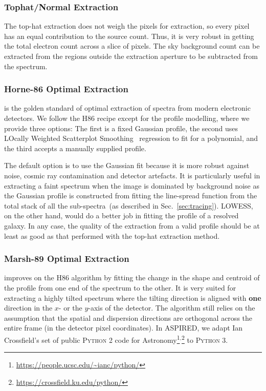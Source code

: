 \documentclass[linenumbers, twocolumn]{aastex631}
\begin{document}
\subsubsection*{Tophat/Normal Extraction}
\label{sec:tophat}
The top-hat extraction does not weigh the pixels for extraction,
so every pixel has an equal contribution to the source count. Thus,
it is very robust in getting the total electron count across
a slice of pixels. The sky background count can be extracted
from the regions outside the extraction aperture to be
subtracted from the spectrum.

\subsubsection*{Horne-86 Optimal Extraction}
\citet[hereafter H86]{1986PASP...98..609H} is the golden standard
of optimal extraction of spectra from modern electronic detectors.
We follow the H86 recipe except for the profile modelling,
where we provide three options: The first is a fixed Gaussian
profile, the second uses LOcally Weighted Scatterplot
Smoothing~\citep[LOWESS]{doi:10.1080/01621459.1979.10481038}
regression to fit for a polynomial, and the third accepts
a manually supplied profile.

The default option is to use the Gaussian fit because it is
more robust against noise, cosmic ray contamination and detector
artefacts. It is particularly useful in extracting a faint
spectrum when the image is dominated by background noise as the
Gaussian profile is constructed from fitting the line-spread
function from the total stack of all the
sub-spectra~(as described in Sec.~\ref{sec:tracing}).
LOWESS, on the other hand, would do a better job in fitting
the profile of a resolved galaxy. In any case, the quality
of the extraction from a valid profile should be at least as
good as that performed with the top-hat extraction method.

\subsubsection*{Marsh-89 Optimal Extraction}
\citet[hereafter M89]{1989PASP..101.1032M} improves on the H86 algorithm by
fitting the change in the shape and centroid of the profile from one end of the
spectrum to the other. It is very suited for extracting a highly tilted
spectrum where the tilting direction is aligned with \textbf{one} direction in
the $x$- or the $y$-axis of the detector. The algorithm still relies on the
assumption that the spatial and dispersion directions are orthogonal across
the entire frame (in the detector pixel coordinates). In \textsc{ASPIRED}, we
adapt Ian Crossfield's set of public \textsc{Python 2} code for
Astronomy\footnote{\url{https://people.ucsc.edu/~ianc/python/}}$^,$\footnote{\url{https://crossfield.ku.edu/python/}}
to \textsc{Python 3}.
\end{document}
